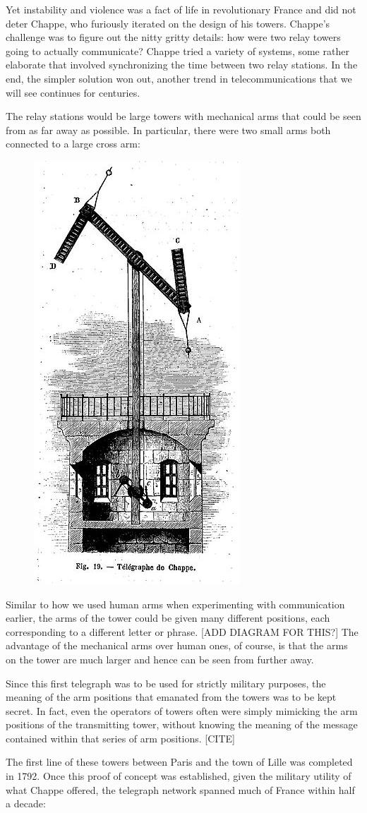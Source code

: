\documentclass[UTF8]{book}
\begin{document}
\begin{CJK}{UTF8}{gbsn}
Yet instability and violence was a fact of life in revolutionary France and did not deter Chappe, who furiously iterated on the design of his towers. Chappe's challenge was to figure out the nitty gritty details: how were two relay towers going to actually communicate? Chappe tried a variety of systems, some rather elaborate that involved synchronizing the time between two relay stations. In the end, the simpler solution won out, another trend in telecommunications that we will see continues for centuries.

The relay stations would be large towers with mechanical arms that could be seen from as far away as possible. In particular, there were two small arms both connected to a large cross arm:

\begin{figure}[H]
\centering
\includegraphics[width=0.3\linewidth]{chappe_tower}
\end{figure}

Similar to how we used human arms when experimenting with communication earlier, the arms of the tower could be given many different positions, each corresponding to a different letter or phrase. [ADD DIAGRAM FOR THIS?] The advantage of the mechanical arms over human ones, of course, is that the arms on the tower are much larger and hence can be seen from further away.

Since this first telegraph was to be used for strictly military purposes, the meaning of the arm positions that emanated from the towers was to be kept secret. In fact, even the operators of towers often were simply mimicking the arm positions of the transmitting tower, without knowing the meaning of the message contained within that series of arm positions. [CITE]

The first line of these towers between Paris and the town of Lille was completed in 1792. Once this proof of concept was established, given the military utility of what Chappe offered, the telegraph network spanned much of France within half a decade:


\end{CJK}
\end{document}
